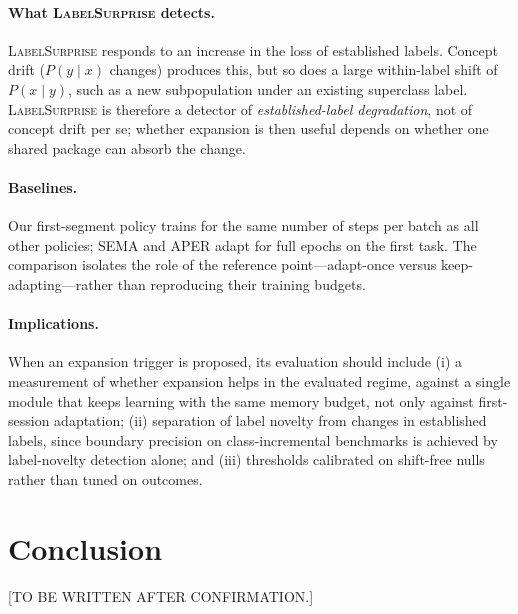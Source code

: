 \documentclass[10pt]{article}
\newcommand{\ls}{\textsc{LabelSurprise}}
\begin{document}
\paragraph{What \ls{} detects.} \ls{} responds to an increase in the loss of established labels. Concept drift ($P(y\mid x)$ changes) produces this, but so does a large within-label shift of $P(x\mid y)$, such as a new subpopulation under an existing superclass label. \ls{} is therefore a detector of \emph{established-label degradation}, not of concept drift per se; whether expansion is then useful depends on whether one shared package can absorb the change.

\paragraph{Baselines.} Our first-segment policy trains for the same number of steps per batch as all other policies; SEMA and APER adapt for full epochs on the first task. The comparison isolates the role of the reference point---adapt-once versus keep-adapting---rather than reproducing their training budgets.

\paragraph{Implications.} When an expansion trigger is proposed, its evaluation should include (i) a measurement of whether expansion helps in the evaluated regime, against a single module that keeps learning with the same memory budget, not only against first-session adaptation; (ii) separation of label novelty from changes in established labels, since boundary precision on class-incremental benchmarks is achieved by label-novelty detection alone; and (iii) thresholds calibrated on shift-free nulls rather than tuned on outcomes.

\section{Conclusion}

[TO BE WRITTEN AFTER CONFIRMATION.]




\appendix
\end{document}

